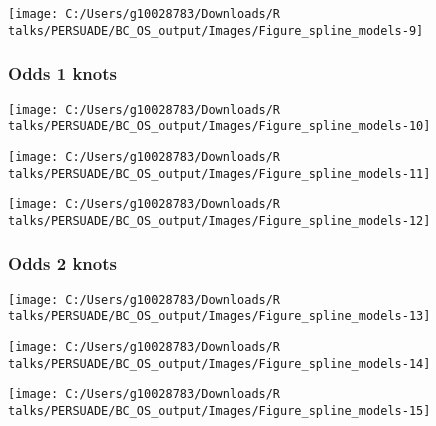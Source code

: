 \documentclass[
]{article}
\begin{document}
\begin{flushleft}\texttt{[image: C:/Users/g10028783/Downloads/R talks/PERSUADE/BC\_OS\_output/Images/Figure\_spline\_models-9]} \end{flushleft}

\clearpage

\subsubsection{Odds 1 knots}\label{odds-1-knots}

\begin{flushleft}\texttt{[image: C:/Users/g10028783/Downloads/R talks/PERSUADE/BC\_OS\_output/Images/Figure\_spline\_models-10]} \end{flushleft}

\begin{flushleft}\texttt{[image: C:/Users/g10028783/Downloads/R talks/PERSUADE/BC\_OS\_output/Images/Figure\_spline\_models-11]} \end{flushleft}

\begin{flushleft}\texttt{[image: C:/Users/g10028783/Downloads/R talks/PERSUADE/BC\_OS\_output/Images/Figure\_spline\_models-12]} \end{flushleft}

\clearpage

\subsubsection{Odds 2 knots}\label{odds-2-knots}

\begin{flushleft}\texttt{[image: C:/Users/g10028783/Downloads/R talks/PERSUADE/BC\_OS\_output/Images/Figure\_spline\_models-13]} \end{flushleft}

\begin{flushleft}\texttt{[image: C:/Users/g10028783/Downloads/R talks/PERSUADE/BC\_OS\_output/Images/Figure\_spline\_models-14]} \end{flushleft}

\begin{flushleft}\texttt{[image: C:/Users/g10028783/Downloads/R talks/PERSUADE/BC\_OS\_output/Images/Figure\_spline\_models-15]} \end{flushleft}
\end{document}

